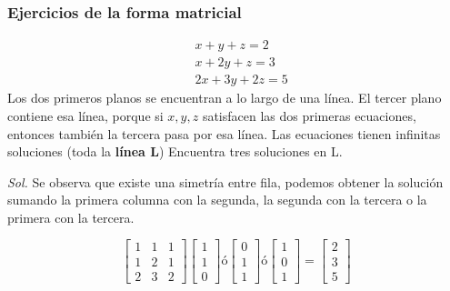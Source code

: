\subsubsection{Ejercicios de la forma matricial}
\begin{problem}
\begin{align*}
	 & x+ y+ z=2        \\
	 & x + 2y + z = 3   \\
	 & 2x + 3y + 2z = 5
\end{align*}
Los dos primeros planos se encuentran a lo largo de una línea. El tercer plano contiene esa línea, porque si $x, y, z$ satisfacen las dos primeras ecuaciones, entonces también la tercera pasa por esa línea. Las ecuaciones tienen infinitas soluciones (toda la \textbf{línea L}) Encuentra tres soluciones en L.
\end{problem}

\textit{ Sol. }
Se observa que existe una simetría entre fila, podemos obtener la solución sumando la primera columna con la segunda, la segunda con la tercera o la primera con la tercera.

\begin{equation}
	\begin{bmatrix}
		1 & 1 & 1 \\1&2&1\\ 2&3&2
	\end{bmatrix}\begin{bmatrix}
		1 \\1\\0
	\end{bmatrix} \text{ó} \begin{bmatrix}
		0 \\1\\1
	\end{bmatrix} \text{ó} \begin{bmatrix}
		1 \\0\\1
	\end{bmatrix} = \begin{bmatrix}
		2 \\3\\5
	\end{bmatrix}
\end{equation}

\begin{problem}[Mueva el tercer plano del problema 1 a un plano paralelo de $2x + 3y + 2z = 9$. Ahora las tres ecuaciones no tienen solución, ¿por qué no? Los dos primeros planos se encuentran a lo largo de la \textbf{línea L}, pero el tercer plano no tienen..? esa línea.]
\end{problem}

